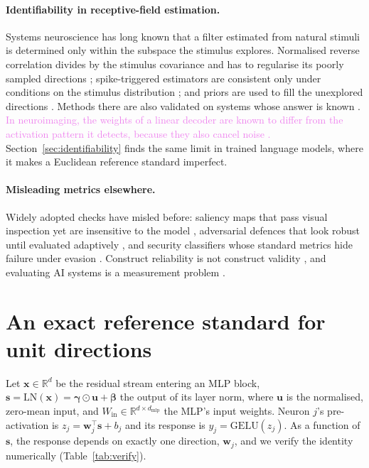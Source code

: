 \documentclass[10pt]{article}
\newcommand{\draft}[1]{\textcolor{violet}{#1}}
\begin{document}
\paragraph{Identifiability in receptive-field estimation.} Systems neuroscience has long known
that a filter estimated from natural stimuli is determined only within the subspace the
stimulus explores. Normalised reverse correlation divides by the stimulus covariance and has
to regularise its poorly sampled directions \citep{theunissen2001strf,wu2006sysid};
spike-triggered estimators are consistent only under conditions on the stimulus distribution
\citep{paninski2003convergence}; and priors are used to fill the unexplored directions
\citep{park2011localized}. Methods there are also validated on systems whose answer is known
\citep{jonas2017microprocessor}. \draft{In neuroimaging, the weights of a linear decoder are
known to differ from the activation pattern it detects, because they also cancel noise
\citep{haufe2014interpretation}.} Section~\ref{sec:identifiability} finds the same limit in
trained language models, where it makes a Euclidean reference standard imperfect.

\paragraph{Misleading metrics elsewhere.} Widely adopted checks have misled before:
saliency maps that pass visual inspection yet are insensitive to the model
\citep{adebayo2018sanity}, adversarial defences that look robust until evaluated adaptively
\citep{athalye2018obfuscated}, and security classifiers whose standard metrics hide failure
under evasion \citep{gardiner2016security,arp2022dos}. Construct reliability is not construct
validity \citep{jacobs2021measurement}, and evaluating AI systems is a measurement problem
\citep{wallach2025position}.

\section{An exact reference standard for unit directions}
\label{sec:substrate}

Let $\mathbf{x}\in\mathbb{R}^{d}$ be the residual stream entering an MLP block,
$\mathbf{s} = \mathrm{LN}(\mathbf{x}) = \boldsymbol{\gamma}\odot\mathbf{u} +
\boldsymbol{\beta}$ the output of its layer norm, where $\mathbf{u}$ is the normalised,
zero-mean input, and $W_{\text{in}}\in\mathbb{R}^{d\times d_{\text{mlp}}}$ the MLP's input
weights. Neuron $j$'s pre-activation is $z_j = \mathbf{w}_j^\top\mathbf{s} + b_j$ and its
response is $y_j = \mathrm{GELU}(z_j)$. As a function of $\mathbf{s}$, the response depends
on exactly one direction, $\mathbf{w}_j$, and we verify the identity numerically
(Table~\ref{tab:verify}).
\end{document}
